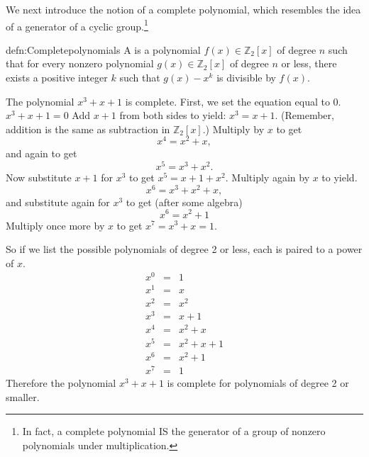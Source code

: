 %
%

We next introduce the notion of a complete polynomial, which resembles the idea of a generator of a cyclic group.\footnote{In fact, a complete polynomial IS the generator of a group of nonzero polynomials under multiplication.} 

\begin{defn}{defn:Completepolynomials}
A  is a polynomial $f(x)\in \mathbb{Z}_2[x]$ of degree $n$ such that for every nonzero polynomial $g(x)\in \mathbb{Z}_2[x]$ of degree $n$ or less, there exists a positive integer $k$ such that $g(x)-x^k$  is divisible by $f(x)$.
\end{defn}

\begin{example}{}
The polynomial $x^3 + x + 1$ is complete.  First, we set the equation equal to 0. $x^3 + x + 1=0$ Add $x+1$ from both sides to yield: $x^3 = x+1$. (Remember, addition is the same as subtraction in $\mathbb{Z}_2[x]$.) Multiply by $x$ to get
\[x^4 = x^2 + x,\]
and again to get
\[x^5 = x^3 + x^2.\] 
Now substitute $x+1$ for $x^3$ to get $x^5 = x + 1 + x^2$. Multiply again by $x$ to yield.
\[x^6 = x^3 + x^2 + x,\]
and substitute again for $x^3$ to get (after some algebra)
\[x^6 = x^2 + 1\]
Multiply once more by $x$ to get $x^7 = x^3 + x = 1.$

So if we list the possible polynomials of degree 2 or less, each is paired to a power of $x$.
\[
\begin{array}{lcr}
x^0 & = & 1 \\
x^1 & = & x \\ 
x^2 & = & x^2 \\ 
x^3 & = & x+1 \\ 
x^4 & = & x^2 + x \\ 
x^5 & = & x^2 + x + 1 \\ 
x^6 & = & x^2 + 1 \\ 
x^7 & = & 1 
\end{array}\]
Therefore the polynomial $x^3 + x + 1$ is complete for polynomials of degree 2 or smaller.  
\end {example}

